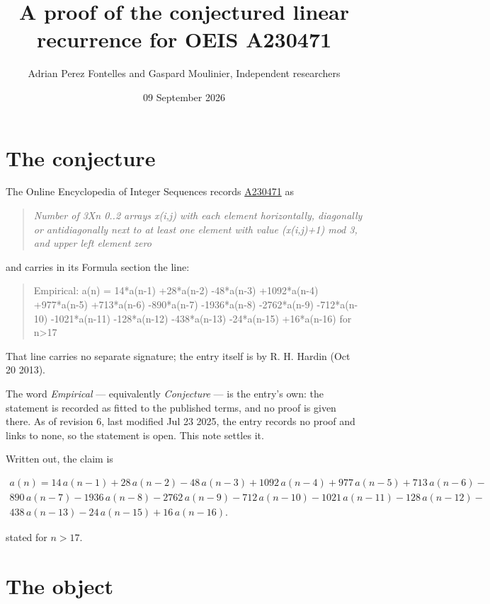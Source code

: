 \documentclass[11pt]{article}
\title{A proof of the conjectured linear recurrence for OEIS A230471}
\author{Adrian Perez Fontelles and Gaspard Moulinier, Independent researchers}
\date{09 September 2026}
\theoremstyle{definition}
\begin{document}
\maketitle
\section{The conjecture}

The Online Encyclopedia of Integer Sequences records \href{https://oeis.org/A230471}{A230471} as

\begin{quote}\itshape Number of 3Xn 0..2 arrays x(i,j) with each element horizontally, diagonally or antidiagonally next to at least one element with value (x(i,j)+1) mod 3, and upper left element zero\end{quote}

and carries in its Formula section the line:

\begin{quote}\ttfamily Empirical: a(n) = 14*a(n-1) +28*a(n-2) -48*a(n-3) +1092*a(n-4) +977*a(n-5) +713*a(n-6) -890*a(n-7) -1936*a(n-8) -2762*a(n-9) -712*a(n-10) -1021*a(n-11) -128*a(n-12) -438*a(n-13) -24*a(n-15) +16*a(n-16) for n>17\end{quote}

That line carries no separate signature; the entry itself is by R. H. Hardin (Oct 20 2013).

The word {\itshape Empirical} --- equivalently {\itshape Conjecture} --- is the entry's own: the statement is recorded as fitted to the published terms, and no proof is given there. As of revision 6, last modified Jul 23 2025, the entry records no proof and links to none, so the statement is open. This note settles it.

Written out, the claim is

\begin{multline*} a(n) = 14\,a(n-1) + 28\,a(n-2) - 48\,a(n-3) + 1092\,a(n-4) + 977\,a(n-5) + 713\,a(n-6) - \\ 890\,a(n-7) - 1936\,a(n-8) - 2762\,a(n-9) - 712\,a(n-10) - 1021\,a(n-11) - 128\,a(n-12) - \\ 438\,a(n-13) - 24\,a(n-15) + 16\,a(n-16). \end{multline*}

stated for $n > 17$.

\section{The object}
\end{document}
